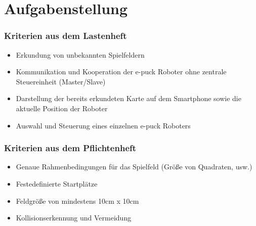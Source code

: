 \documentclass{beamer}
\begin{document}
\section{Aufgabenstellung}

\begin{frame}
  \frametitle{Kriterien aus dem Lastenheft}
  
	\begin{itemize}
		\item Erkundung von unbekannten Spielfeldern
		\item Kommunikation und Kooperation der e-puck Roboter ohne zentrale Steuereinheit 				(Master/Slave)
		\item Darstellung der bereits erkundeten Karte auf dem Smartphone sowie die 					aktuelle Position der Roboter
		\item Auswahl und Steuerung eines einzelnen e-puck Roboters
	\end{itemize}  
\end{frame}

\begin{frame}
  \frametitle{Kriterien aus dem Pflichtenheft}
  
  	\begin{itemize}
		\item Genaue Rahmenbedingungen für das Spielfeld (Größe von Quadraten, usw.)
		\item Festedefinierte Startplätze
		\item Feldgröße von mindestens 10cm x 10cm
		\item Kollisionserkennung und Vermeidung
	\end{itemize}  
\end{frame}
\end{document}
